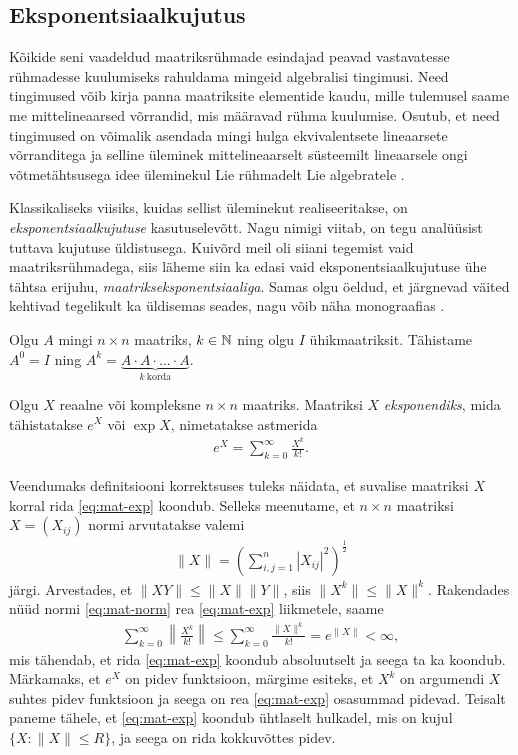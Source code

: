 \subsection{Eksponentsiaalkujutus}

Kõikide seni vaadeldud maatriksrühmade esindajad peavad
vastavatesse rühmadesse kuulumiseks rahuldama mingeid algebralisi tingimusi.
Need tingimused võib kirja panna maatriksite elementide kaudu, mille
tulemusel saame me mittelineaarsed võrrandid, mis määravad rühma kuulumise.
Osutub, et need tingimused on võimalik asendada mingi hulga ekvivalentsete
lineaarsete võrranditega ja selline üleminek mittelineaarselt süsteemilt
lineaarsele ongi võtmetähtsusega idee üleminekul Lie rühmadelt Lie
algebratele \cite{johan1989survey}.

Klassikaliseks viisiks, kuidas sellist üleminekut realiseeritakse, on
\emph{eksponentsiaalkujutuse} kasutuselevõtt. Nagu nimigi viitab, on
tegu analüüsist tuttava kujutuse üldistusega. Kuivõrd meil oli
siiani tegemist vaid maatriksrühmadega, siis läheme siin ka edasi
vaid eksponentsiaalkujutuse
ühe tähtsa erijuhu, \emph{maatrikseksponentsiaaliga}. Samas olgu öeldud,
et järgnevad väited kehtivad tegelikult ka üldisemas seades,
nagu võib näha monograafias \cite{kirillov2008introduction}.

Olgu $A$ mingi $n \times n$ maatriks, $k \in \mathbb{N}$ ning olgu $I$
ühikmaatriksit. Tähistame $A^0 = I$ ning
$A^k = \underbrace{A \cdot A \cdot \ldots \cdot A}_{k\ \text{korda}}$.

\begin{dfn}
    Olgu $X$ reaalne või kompleksne $n \times n$ maatriks. Maatriksi
    $X$ \emph{eksponendiks}, mida tähistatakse $e^X$ või $\exp X$, nimetatakse
    astmerida
    \begin{align}\label{eq:mat-exp}
        e^X = \sum_{k=0}^{\infty} \frac{X^k}{k!}.
    \end{align}
\end{dfn}

Veendumaks definitsiooni korrektsuses tuleks näidata, et suvalise
maatriksi $X$ korral rida \eqref{eq:mat-exp} koondub. Selleks meenutame,
et $n \times n$ maatriksi $X = (X_{ij})$ normi arvutatakse valemi
\begin{align}\label{eq:mat-norm}
    \| X \| = \left( \sum_{i,j=1}^n |X_{ij}|^2 \right)^{\frac{1}{2}}
\end{align}
järgi. Arvestades, et $\| XY \| \le \|X\| \|Y\|$, siis $\|X^k\| \le \|X\|^k$.
Rakendades nüüd normi \eqref{eq:mat-norm} rea \eqref{eq:mat-exp} liikmetele,
saame
\begin{align*}
    \sum_{k=0}^\infty \left\lVert \frac{X^k}{k!} \right\rVert \le
    \sum_{k=0}^\infty \frac{\|X\|^k}{k!} = e^{\|X\|} < \infty,
\end{align*}
mis tähendab, et rida \eqref{eq:mat-exp} koondub absoluutselt ja seega
ta ka koondub. Märkamaks, et $e^X$ on pidev funktsioon, märgime esiteks,
et $X^k$ on argumendi $X$ suhtes pidev funktsioon ja seega on rea
\eqref{eq:mat-exp} osasummad pidevad. Teisalt paneme tähele, et
\eqref{eq:mat-exp} koondub ühtlaselt hulkadel, mis on kujul
$\{ X : \|X\| \le R \}$, ja seega on rida kokkuvõttes pidev.

